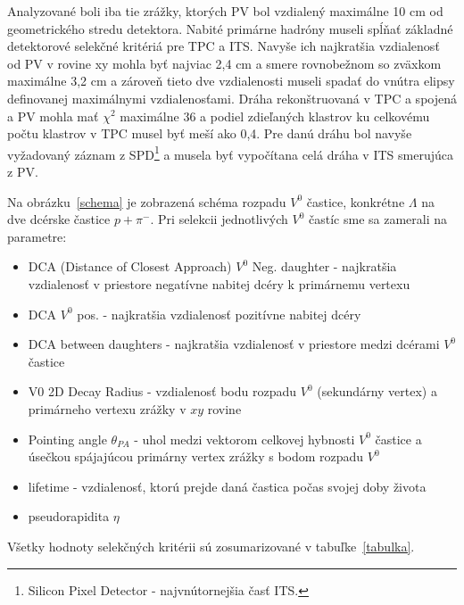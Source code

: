 \documentclass[thesismargins, thesislinespacing]{rnthesis}
\begin{document}
Analyzované boli iba tie zrážky, ktorých PV bol vzdialený maximálne 10 cm od geometrického stredu detektora. Nabité primárne hadróny museli spĺňať základné detektorové selekčné kritériá pre TPC a ITS. Navyše ich najkratšia vzdialenosť od PV v rovine xy mohla byť najviac 2,4 cm a smere rovnobežnom so zväxkom maximálne 3,2 cm a zároveň tieto dve vzdialenosti museli spadať do vnútra elipsy definovanej maximálnymi vzdialenosťami. Dráha rekonštruovaná v TPC a spojená a PV mohla mať $\chi ^2$ maximálne 36 a podiel zdieľaných klastrov ku celkovému počtu klastrov v TPC musel byť meší ako 0,4. Pre danú dráhu bol navyše vyžadovaný záznam z SPD\footnote{Silicon Pixel Detector - najvnútornejšia časť ITS. } a musela byť vypočítana celá dráha v ITS smerujúca z PV.

Na obrázku~\ref{schema} je zobrazená schéma rozpadu $V^0$ častice, konkrétne $\Lambda$ na dve dcérske častice $p+\pi^{-}$. Pri selekcii jednotlivých $V^0$ častíc sme sa zamerali na parametre:
\begin{itemize}
	\item DCA (Distance of Closest Approach) $V^0$ Neg. daughter - najkratšia vzdialenosť v priestore negatívne nabitej dcéry k primárnemu vertexu
	\item DCA $V^0$ pos. - najkratšia vzdialenosť pozitívne nabitej dcéry
	\item DCA between daughters - najkratšia vzdialenosť v priestore medzi dcérami $V^0$ častice
	\item V0 2D Decay Radius  - vzdialenosť bodu rozpadu $V^0$ (sekundárny vertex) a primárneho vertexu zrážky v $xy$ rovine
	\item Pointing angle $\theta_{PA}$ - uhol medzi vektorom celkovej hybnosti $V^0$ častice a úsečkou spájajúcou primárny vertex zrážky s bodom rozpadu $V^0$ 
	\item lifetime - vzdialenosť, ktorú prejde daná častica počas svojej doby života
	\item pseudorapidita $\eta$
\end{itemize} 
Všetky hodnoty selekčných kritérii sú zosumarizované v tabuľke~\ref{tabulka}.
\end{document}

